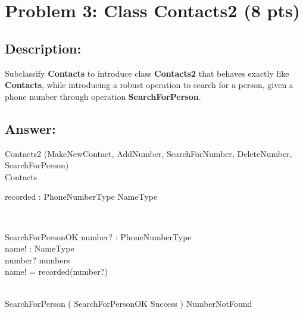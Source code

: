 \newpage
\section{Problem 3: Class Contacts2 (8 pts)}

\subsection{Description:}
Subclassify \textbf{Contacts} to introduce class \textbf{Contacts2} that behaves exactly like \textbf{Contacts},
while introducing a robust operation to search for a person, given a phone number through
operation \textbf{SearchForPerson}.

\subsection{Answer:}

\begin{class}{Contacts2}
\also
\upharpoonright (MakeNewContact, AddNumber, SearchForNumber, DeleteNumber,\\ SearchForPerson) \\
Contacts\\
\begin{state}
 recorded : PhoneNumberType \pfun NameType
\end{state} \\
\begin{op}{SearchForPersonOK}
number? : PhoneNumberType \\
name! : NameType\\
\ST
number? \in numbers\\
name! = recorded(number?)
\end{op}\\
\also
SearchForPerson \sdef ( SearchForPersonOK \land Success ) \oplus NumberNotFound\\
\end{class}

